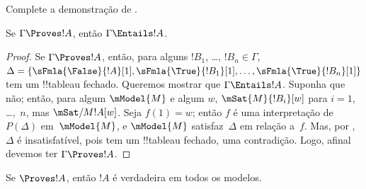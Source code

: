 \documentclass[../../../include/open-logic-section]{subfiles}
\begin{document}
\begin{prob}
Complete a demonstração de .
\end{prob}

\begin{cor}
Se $\Gamma \Proves !A$, então $\Gamma \Entails !A$.
\end{cor}

\begin{proof}
  Se $\Gamma \Proves !A$, então, para alguns $!B_1$, \dots, $!B_n \in
  \Gamma$, $\Delta = \{\sFmla{\False}{!A}[1], \sFmla{\True}{!B_1}[1],
  \dots, \sFmla{\True}{!B_n}[1]\}$ tem um !!{tableau} fechado. Queremos
  mostrar que $\Gamma \Entails !A$. Suponha que não; então, para algum
  $\mModel{M}$ e algum $w$, $\mSat{M}{!B_i}[w]$ para $i=1$, \dots,~$n$,
  mas $\mSat/{M}{!A}[w]$. Seja $f(1) = w$; então $f$ é uma interpretação
  de~$P(\Delta)$ em~$\mModel{M}$, e $\mModel{M}$ satisfaz~$\Delta$ em
  relação a~$f$. Mas, por , $\Delta$ é
  insatisfatível, pois tem um !!{tableau} fechado, uma contradição.
  Logo, afinal devemos ter $\Gamma \Proves !A$.
\end{proof}

\begin{cor}
Se $\Proves !A$, então $!A$ é verdadeira em todos os modelos.
\end{cor}
\end{document}
